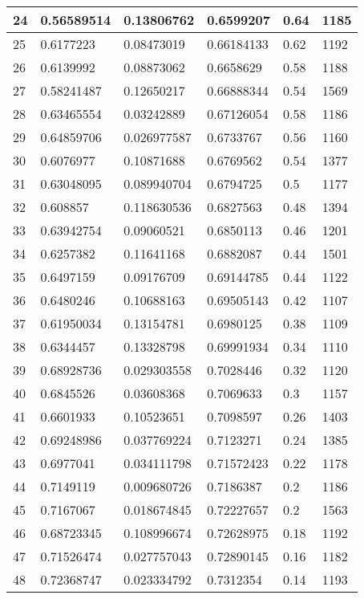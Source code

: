 \begin{longtable}{|l|l|l|l|l|l|}
24 & 0.56589514 & 0.13806762 & 0.6599207 & 0.64 & 1185 \\ \hline 
25 & 0.6177223 & 0.08473019 & 0.66184133 & 0.62 & 1192 \\ \hline 
26 & 0.6139992 & 0.08873062 & 0.6658629 & 0.58 & 1188 \\ \hline 
27 & 0.58241487 & 0.12650217 & 0.66888344 & 0.54 & 1569 \\ \hline 
28 & 0.63465554 & 0.03242889 & 0.67126054 & 0.58 & 1186 \\ \hline 
29 & 0.64859706 & 0.026977587 & 0.6733767 & 0.56 & 1160 \\ \hline 
30 & 0.6076977 & 0.10871688 & 0.6769562 & 0.54 & 1377 \\ \hline 
31 & 0.63048095 & 0.089940704 & 0.6794725 & 0.5 & 1177 \\ \hline 
32 & 0.608857 & 0.118630536 & 0.6827563 & 0.48 & 1394 \\ \hline 
33 & 0.63942754 & 0.09060521 & 0.6850113 & 0.46 & 1201 \\ \hline 
34 & 0.6257382 & 0.11641168 & 0.6882087 & 0.44 & 1501 \\ \hline 
35 & 0.6497159 & 0.09176709 & 0.69144785 & 0.44 & 1122 \\ \hline 
36 & 0.6480246 & 0.10688163 & 0.69505143 & 0.42 & 1107 \\ \hline 
37 & 0.61950034 & 0.13154781 & 0.6980125 & 0.38 & 1109 \\ \hline 
38 & 0.6344457 & 0.13328798 & 0.69991934 & 0.34 & 1110 \\ \hline 
39 & 0.68928736 & 0.029303558 & 0.7028446 & 0.32 & 1120 \\ \hline 
40 & 0.6845526 & 0.03608368 & 0.7069633 & 0.3 & 1157 \\ \hline 
41 & 0.6601933 & 0.10523651 & 0.7098597 & 0.26 & 1403 \\ \hline 
42 & 0.69248986 & 0.037769224 & 0.7123271 & 0.24 & 1385 \\ \hline 
43 & 0.6977041 & 0.034111798 & 0.71572423 & 0.22 & 1178 \\ \hline 
44 & 0.7149119 & 0.009680726 & 0.7186387 & 0.2 & 1186 \\ \hline 
45 & 0.7167067 & 0.018674845 & 0.72227657 & 0.2 & 1563 \\ \hline 
46 & 0.68723345 & 0.108996674 & 0.72628975 & 0.18 & 1192 \\ \hline 
47 & 0.71526474 & 0.027757043 & 0.72890145 & 0.16 & 1182 \\ \hline 
48 & 0.72368747 & 0.023334792 & 0.7312354 & 0.14 & 1193 \\ \hline 

\end{longtable}
